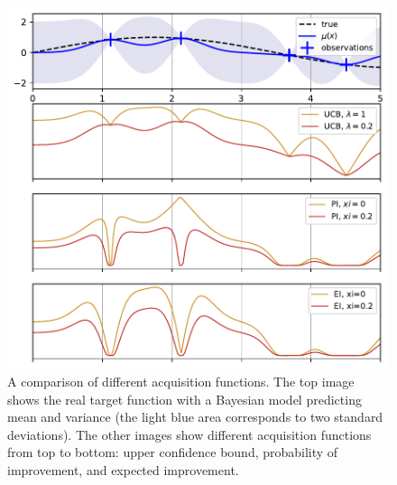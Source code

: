  \begin{figure}
    \centering
    \includegraphics[scale=0.8]{img/acq_example.pdf}
    \caption{A comparison of different acquisition functions. The top image shows the real target function with a Bayesian model predicting mean and variance (the light blue area corresponds to two standard deviations). The other images show different acquisition functions from top to bottom: upper confidence bound, probability of improvement, and expected improvement.}
    \label{fig:ei}
\end{figure}



\newpage
